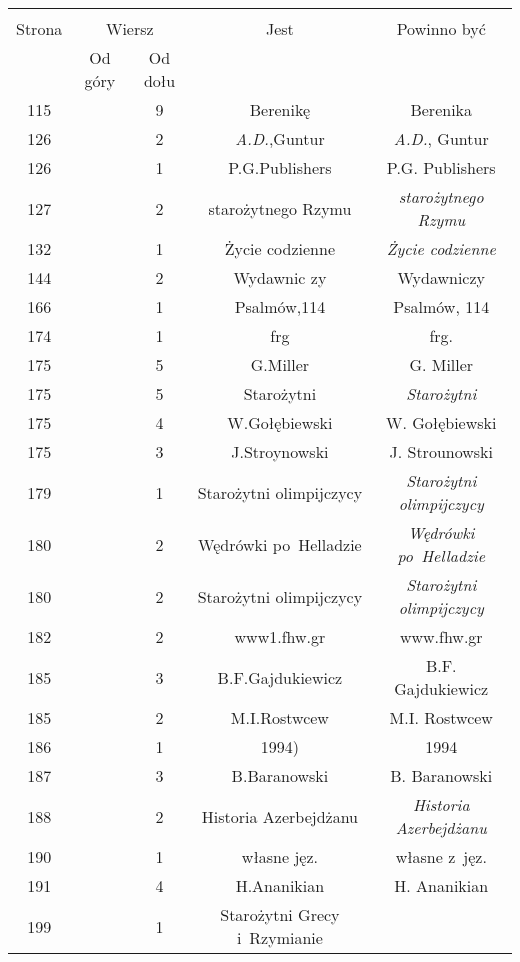 \documentclass[a4paper,11pt]{article}
\begin{document}
\begin{center}
  \begin{tabular}{|c|c|c|c|c|}
    \hline
    & \multicolumn{2}{c|}{} & & \\
    Strona & \multicolumn{2}{c|}{Wiersz} & Jest
                              & Powinno być \\ \cline{2-3}
    & Od góry & Od dołu & & \\
    \hline
    115 & &  9 & Berenikę & Berenika \\
    126 & &  2 & \textit{A.D.},Guntur & \textit{A.D.}, Guntur \\
    126 & &  1 & P.G.Publishers & P.G. Publishers \\
    127 & &  2 & starożytnego Rzymu & \textit{starożytnego Rzymu} \\
    132 & &  1 & Życie codzienne & \textit{Życie codzienne} \\
    144 & &  2 & Wydawnic zy & Wydawniczy \\
    166 & &  1 & Psalmów,114 & Psalmów, 114 \\
    174 & &  1 & frg & frg. \\
    175 & &  5 & G.Miller & G. Miller \\
    175 & &  5 & Starożytni & \textit{Starożytni} \\
    175 & &  4 & W.Gołębiewski & W. Gołębiewski \\
    175 & &  3 & J.Stroynowski & J. Strounowski \\
    179 & &  1 & Starożytni olimpijczycy
           & \textit{Starożytni olimpijczycy} \\
    180 & &  2 & Wędrówki po~Helladzie & \textit{Wędrówki po~Helladzie} \\
    180 & &  2 & Starożytni olimpijczycy
           & \textit{Starożytni olimpijczycy} \\
    182 & &  2 & www1.fhw.gr & www.fhw.gr \\
    185 & &  3 & B.F.Gajdukiewicz & B.F. Gajdukiewicz \\
    185 & &  2 & M.I.Rostwcew & M.I. Rostwcew \\
    186 & &  1 & 1994) & 1994 \\
    187 & &  3 & B.Baranowski & B. Baranowski \\
    188 & &  2 & Historia Azerbejdżanu & \textit{Historia Azerbejdżanu} \\
    190 & &  1 & własne jęz. & własne z~jęz. \\
    191 & &  4 & H.Ananikian & H. Ananikian \\
    199 & &  1 & Starożytni Grecy i~Rzymianie

\end{tabular}
\end{center}
\end{document}
